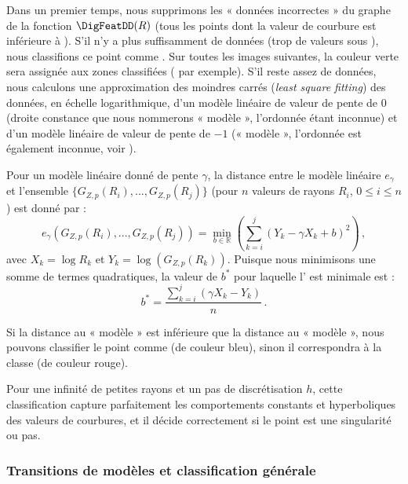 Dans un premier temps, nous supprimons les « données incorrectes » du graphe de
la fonction $\DigFeatDD(R)$ (\cad tous les points dont la valeur de courbure est
inférieure à \CurvMax). S'il n'y a plus suffisamment de données (trop de valeurs
sous \CurvMax), nous classifions ce point comme \featflat. Sur toutes les images
suivantes, la couleur verte sera assignée aux zones classifiées \featflat
( par exemple). S'il reste assez de
données, nous calculons une approximation des moindres carrés (\emph{least
square fitting}) des données, en échelle logarithmique, d'un modèle linéaire de
valeur de pente de $0$ (droite constance que nous nommerons « modèle \featsmooth
», l'ordonnée étant inconnue) et d'un modèle linéaire de valeur de pente de $-1$
(« modèle \featedge », l'ordonnée est également inconnue, voir
).

Pour un modèle linéaire donné de pente $\gamma$, la distance entre le modèle
linéaire $e_\gamma$ et l'ensemble $\{G_{Z,p}(R_i), ..., G_{Z,p}(R_j)\}$ (pour
$n$ valeurs de rayons $R_i$, $0 \leq i \leq n$) est donné par :
\begin{equation}
  \label{eq:distance-modele-lineaire}
  e_\gamma(G_{Z,p}(R_i), ..., G_{Z,p}(R_j))= \min_{b\in \mathbb{R}}
  \left ( \sum_{k=i}^j (Y_k - \gamma X_k + b)^2\right)\,,
\end{equation}
avec $X_k=\log R_k$ et $Y_k=\log(G_{Z,p}(R_k))$. Puisque nous minimisons une
somme de termes quadratiques, la valeur de $b^*$ pour laquelle
l' est minimale est :
\begin{equation}
  b^* = \frac{\sum_{k=i}^j ( \gamma X_k - Y_k)}{n}\,.
\end{equation}

Si la distance au « modèle \featsmooth » est inférieure que la distance au «
modèle \featedge », nous pouvons classifier le point comme \featsmooth (de
couleur bleu), sinon il correspondra à la classe \featedge (de couleur rouge).

Pour une infinité de petites rayons et un pas de discrétisation $h$, cette
classification capture parfaitement les comportements constants et hyperboliques
des valeurs de courbures, et il décide correctement si le point est une
singularité ou pas.

\subsubsection{Transitions de modèles et classification générale}
\label{sec:applications:feature:II:transitions}

